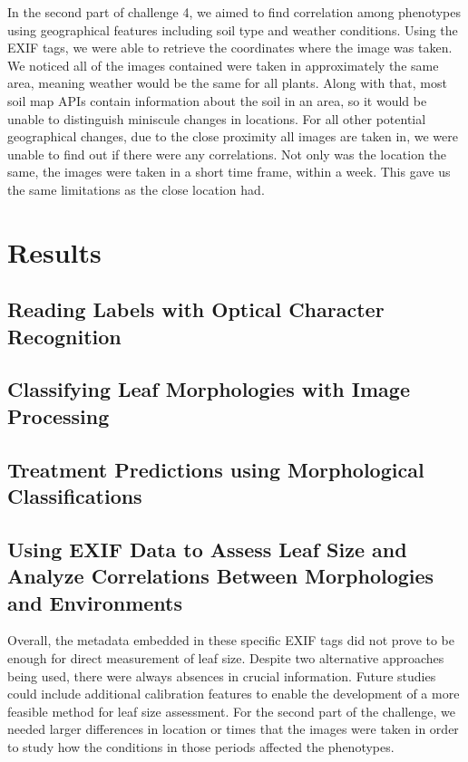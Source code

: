 \documentclass[final,5p,times,twocolumn,authoryear]{elsarticle}
\begin{document}
In the second part of challenge 4, we aimed to find correlation among phenotypes using geographical features including soil type and weather conditions. Using the EXIF tags, we were able to retrieve the coordinates where the image was taken. We noticed all of the images contained were taken in approximately the same area, meaning weather would be the same for all plants. Along with that, most soil map APIs contain information about the soil in an area, so it would be unable to distinguish miniscule changes in locations. For all other potential geographical changes, due to the close proximity all images are taken in, we were unable to find out if there were any correlations. Not only was the location the same, the images were taken in a short time frame, within a week. This gave us the same limitations as the close location had. 


\section{Results}

\subsection{Reading Labels with Optical Character Recognition}
\label{step_1}

\subsection{Classifying Leaf Morphologies with Image Processing}
\label{step_2}

\subsection{Treatment Predictions using Morphological Classifications}
\label{step_3}

\subsection{Using EXIF Data to Assess Leaf Size and Analyze Correlations Between Morphologies and Environments}
\label{step_4}

Overall, the metadata embedded in these specific EXIF tags did not prove to be enough for direct measurement of leaf size. Despite two alternative approaches being used, there were always absences in crucial information. Future studies could include additional calibration features to enable the development of a more feasible method for leaf size assessment. For the second part of the challenge, we needed larger differences in location or times that the images were taken in order to study how the conditions in those periods affected the phenotypes.
\end{document}
